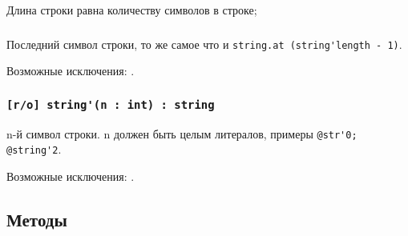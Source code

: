 Длина строки равна количеству символов в строке;

\subsubsection{}

Последний символ строки, то же самое что и \lstinline|string.at (string'length - 1)|.

Возможные исключения: .

\subsubsection{\lstinline|[r/o] string'(n : int) : string|}

n-й символ строки. n должен быть целым литералов, примеры \lstinline|@str'0; @string'2|.

Возможные исключения: .

\subsection{Методы}

